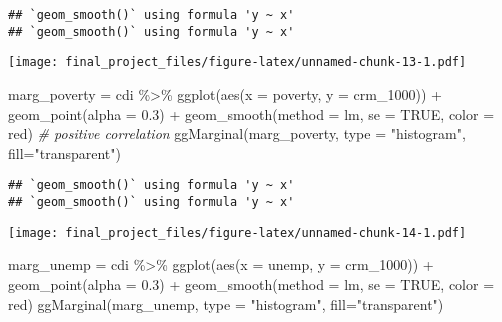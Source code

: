 \documentclass[
]{article}
\newenvironment{Shaded}{\begin{snugshade}}{\end{snugshade}}
\newcommand{\AttributeTok}[1]{\textcolor[rgb]{0.77,0.63,0.00}{#1}}
\newcommand{\CommentTok}[1]{\textcolor[rgb]{0.56,0.35,0.01}{\textit{#1}}}
\newcommand{\ConstantTok}[1]{\textcolor[rgb]{0.00,0.00,0.00}{#1}}
\newcommand{\FloatTok}[1]{\textcolor[rgb]{0.00,0.00,0.81}{#1}}
\newcommand{\FunctionTok}[1]{\textcolor[rgb]{0.00,0.00,0.00}{#1}}
\newcommand{\NormalTok}[1]{#1}
\newcommand{\OtherTok}[1]{\textcolor[rgb]{0.56,0.35,0.01}{#1}}
\newcommand{\SpecialCharTok}[1]{\textcolor[rgb]{0.00,0.00,0.00}{#1}}
\newcommand{\StringTok}[1]{\textcolor[rgb]{0.31,0.60,0.02}{#1}}
\begin{document}
\begin{verbatim}
## `geom_smooth()` using formula 'y ~ x'
## `geom_smooth()` using formula 'y ~ x'
\end{verbatim}

\texttt{[image: final\_project\_files/figure-latex/unnamed-chunk-13-1.pdf]}

\begin{Shaded}
\begin{Highlighting}[]
\NormalTok{marg\_poverty }\OtherTok{=}\NormalTok{ cdi }\SpecialCharTok{\%\textgreater{}\%} \FunctionTok{ggplot}\NormalTok{(}\FunctionTok{aes}\NormalTok{(}\AttributeTok{x =}\NormalTok{ poverty, }\AttributeTok{y =}\NormalTok{ crm\_1000)) }\SpecialCharTok{+} \FunctionTok{geom\_point}\NormalTok{(}\AttributeTok{alpha =} \FloatTok{0.3}\NormalTok{) }\SpecialCharTok{+} \FunctionTok{geom\_smooth}\NormalTok{(}\AttributeTok{method =} \StringTok{\textquotesingle{}lm\textquotesingle{}}\NormalTok{, }\AttributeTok{se =} \ConstantTok{TRUE}\NormalTok{, }\AttributeTok{color =} \StringTok{\textquotesingle{}red\textquotesingle{}}\NormalTok{) }\CommentTok{\# positive correlation}
\FunctionTok{ggMarginal}\NormalTok{(marg\_poverty, }\AttributeTok{type =} \StringTok{"histogram"}\NormalTok{, }\AttributeTok{fill=}\StringTok{"transparent"}\NormalTok{)}
\end{Highlighting}
\end{Shaded}

\begin{verbatim}
## `geom_smooth()` using formula 'y ~ x'
## `geom_smooth()` using formula 'y ~ x'
\end{verbatim}

\texttt{[image: final\_project\_files/figure-latex/unnamed-chunk-14-1.pdf]}

\begin{Shaded}
\begin{Highlighting}[]
\NormalTok{marg\_unemp }\OtherTok{=}\NormalTok{ cdi }\SpecialCharTok{\%\textgreater{}\%} \FunctionTok{ggplot}\NormalTok{(}\FunctionTok{aes}\NormalTok{(}\AttributeTok{x =}\NormalTok{ unemp, }\AttributeTok{y =}\NormalTok{ crm\_1000)) }\SpecialCharTok{+} \FunctionTok{geom\_point}\NormalTok{(}\AttributeTok{alpha =} \FloatTok{0.3}\NormalTok{) }\SpecialCharTok{+} \FunctionTok{geom\_smooth}\NormalTok{(}\AttributeTok{method =} \StringTok{\textquotesingle{}lm\textquotesingle{}}\NormalTok{, }\AttributeTok{se =} \ConstantTok{TRUE}\NormalTok{, }\AttributeTok{color =} \StringTok{\textquotesingle{}red\textquotesingle{}}\NormalTok{)}
\FunctionTok{ggMarginal}\NormalTok{(marg\_unemp, }\AttributeTok{type =} \StringTok{"histogram"}\NormalTok{, }\AttributeTok{fill=}\StringTok{"transparent"}\NormalTok{)}
\end{Highlighting}
\end{Shaded}
\end{document}
